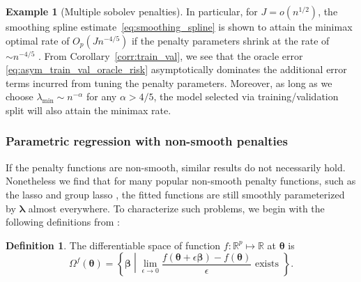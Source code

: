 \documentclass[12pt]{article} %
\theoremstyle{definition}
\newtheorem{definition}{Definition}
\newtheorem{example}{Example}
\begin{document}
\begin{example}[Multiple sobolev penalties]
	In particular, for $J = o(n^{1/2})$, the smoothing spline estimate~\eqref{eq:smoothing_spline} is shown to attain the minimax optimal rate of $O_p(Jn^{-4/5})$ if the penalty parameters shrink at the rate of $\sim n^{-4/5}$ \citep{sadhanala2017additive, horowitz2006optimal}.
	From Corollary~\ref{corr:train_val}, we see that the oracle error \eqref{eq:asym_train_val_oracle_risk} asymptotically dominates the additional error terms incurred from tuning the penalty parameters.
	Moreover, as long as we choose $\lambda_{\min} \sim n^{-\alpha}$ for any $\alpha > 4/5$, the model selected via training/validation split will also attain the minimax rate.
\end{example}

\subsubsection{Parametric regression with non-smooth penalties}
\label{sec:param_nonsmooth}

If the penalty functions are non-smooth, similar results do not necessarily hold. Nonetheless we find that for many popular non-smooth penalty functions, such as the lasso \citep{tibshirani1996regression} and group lasso \citep{yuan2006model}, the fitted functions are still smoothly parameterized by $\boldsymbol \lambda$ almost everywhere.
To characterize such problems, we begin with the following definitions from \citet{feng2017gradient}:

\begin{definition}
	The differentiable space of function $f:\mathbb{R}^p \mapsto \mathbb{R}$ at $\boldsymbol{\theta}$ is
	\begin{equation}
	\Omega^{f}(\boldsymbol{\theta}) = \left \{ \boldsymbol{\beta} \middle | \lim_{\epsilon \rightarrow 0} \frac{f(\boldsymbol{\theta} + \epsilon \boldsymbol{\beta}) - f(\boldsymbol{\theta})}{\epsilon} \text{ exists } \right \}.
	\end{equation}
\end{definition}
\end{document}
